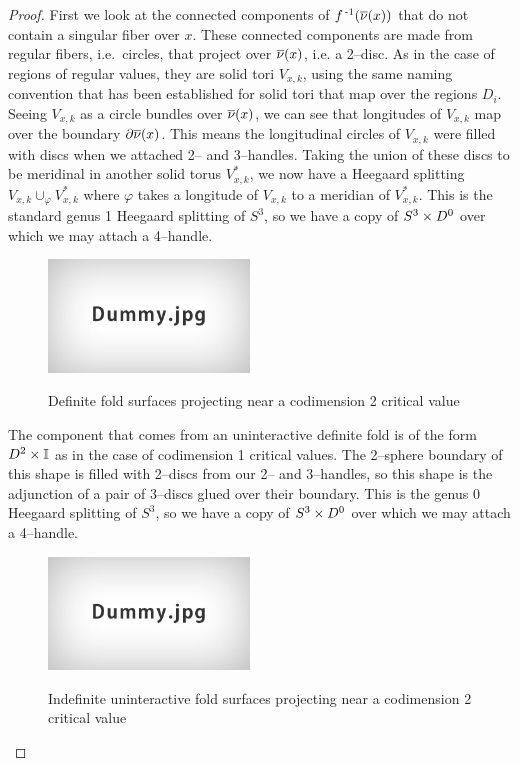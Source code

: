 \begin{proof}
	First we look at the connected components of $f^{\,\text{-}1}(\overline{\nu}(x))$ that do not contain a singular fiber over $x$.
	These connected components are made from regular fibers, i.e.\ circles, that project over $\overline{\nu}(x)$, i.e. a 2--disc.
	As in the case of regions of regular values, they are solid tori $V_{x,k}$, using the same naming convention that has been established for solid tori that map over the regions $D_i$.
	Seeing $V_{x,k}$ as a circle bundles over $\overline{\nu}(x)$, we can see that longitudes of $V_{x,k}$ map over the boundary $\partial\overline{\nu}(x)$.
	This means the longitudinal circles of $V_{x,k}$ were filled with discs when we attached 2-- and 3--handles.
	Taking the union of these discs to be meridinal in another solid torus $V_{x,k}^*$, we now have a Heegaard splitting $V_{x,k}\cup_\varphi V_{x,k}^*$ where $\varphi$ takes a longitude of $V_{x,k}$ to a meridian of $V_{x,k}^*$.
	This is the standard genus 1 Heegaard splitting of $S^3$, so we have a copy of $S^3\times D^0$ over which we may attach a 4--handle.

	\begin{figure}
		\centering
		\captionsetup{justification=centering}
		\caption{Definite fold surfaces projecting near a codimension 2 critical value}
		\includegraphics[height=3cm]{figures/dummy.jpg}
		\label{fig:deffoldprojcodim2}
	\end{figure}

	The component that comes from an uninteractive definite fold is of the form $D^2\times\mathbb{I}$ as in the case of codimension 1 critical values.
	The 2--sphere boundary of this shape is filled with 2--discs from our 2-- and 3--handles, so this shape is the adjunction of a pair of 3--discs glued over their boundary.
	This is the genus 0 Heegaard splitting of $S^3$, so we have a copy of $S^3\times D^0$ over which we may attach a 4--handle.
	
	\begin{figure}
		\centering
		\captionsetup{justification=centering}
		\caption{Indefinite uninteractive fold surfaces projecting near a codimension 2 critical value}
		\includegraphics[height=3cm]{figures/dummy.jpg}
		\label{fig:indeffoldprojcodim2}
	\end{figure}
	

\end{proof}

